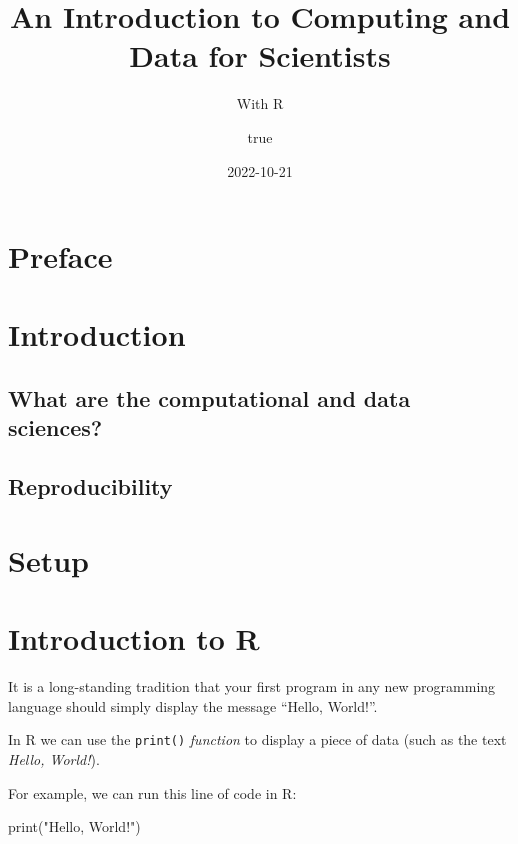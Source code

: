 \documentclass[
]{article}
\title{An Introduction to Computing and Data for Scientists}
\subtitle{With R}
\author{true}
\date{2022-10-21}
\newenvironment{Shaded}{\begin{snugshade}}{\end{snugshade}}
\newcommand{\FunctionTok}[1]{\textcolor[rgb]{0.00,0.00,0.00}{#1}}
\newcommand{\NormalTok}[1]{#1}
\newcommand{\StringTok}[1]{\textcolor[rgb]{0.31,0.60,0.02}{#1}}
\theoremstyle{definition}
\theoremstyle{definition}
\theoremstyle{definition}
\theoremstyle{definition}
\theoremstyle{remark}
\begin{document}
\maketitle

{
\setcounter{tocdepth}{2}
\tableofcontents
}
\hypertarget{preface}{%
\section*{Preface}\label{preface}}

\hypertarget{introduction}{%
\section{Introduction}\label{introduction}}

\hypertarget{what-are-the-computational-and-data-sciences}{%
\subsection{What are the computational and data sciences?}\label{what-are-the-computational-and-data-sciences}}

\hypertarget{reproducibility}{%
\subsection{Reproducibility}\label{reproducibility}}

\hypertarget{setup}{%
\section{Setup}\label{setup}}

\newpage

\hypertarget{introduction-to-r}{%
\section{Introduction to R}\label{introduction-to-r}}

It is a long-standing tradition that your first program in any new programming language should simply display the message ``Hello, World!''.

In R we can use the \texttt{print()} \emph{function} to display a piece of data (such as the text \emph{Hello, World!}).

For example, we can run this line of code in R:

\begin{Shaded}
\begin{Highlighting}[]
\FunctionTok{print}\NormalTok{(}\StringTok{"Hello, World!"}\NormalTok{)}
\end{Highlighting}
\end{Shaded}
\end{document}
